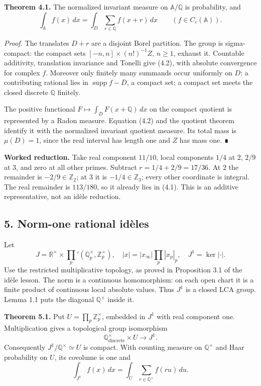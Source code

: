 \documentclass[
  english,
  11pt,
  a4paper,
]{article}
\begin{document}
\textbf{Theorem 4.1.} The normalized invariant measure on
\(\mathbb A/\mathbb Q\) is probability, and \[\int_{\mathbb A} f(x)\,dx
=\int_D\sum_{r\in\mathbb Q}f(x+r)\,dx
\qquad(f\in C_c(\mathbb A)).
\tag{4.2}\]

\emph{Proof.} The translates \(D+r\) are a disjoint Borel partition. The
group is sigma-compact: the compact sets \([-n,n]\times(n!)^{-1}Z\),
\(n\ge1\), exhaust it. Countable additivity, translation invariance and
Tonelli give (4.2), with absolute convergence for complex \(f\).
Moreover only finitely many summands occur uniformly on \(D\): a
contributing rational lies in \(\operatorname{supp}f-\overline D\), a
compact set; a compact set meets the closed discrete \(\mathbb Q\)
finitely.

The positive functional \(F\mapsto\int_D F(x+\mathbb Q)\,dx\) on the
compact quotient is represented by a Radon measure. Equation (4.2) and
the quotient theorem identify it with the normalized invariant quotient
measure. Its total mass is \(\mu(D)=1\), since the real interval has
length one and \(Z\) has mass one. ∎

\textbf{Worked reduction.} Take real component \(11/10\), local
components \(1/4\) at \(2\), \(2/9\) at \(3\), and zero at all other
primes. Subtract \(r=1/4+2/9=17/36\). At \(2\) the remainder is
\(-2/9\in\mathbb Z_2\); at \(3\) it is \(-1/4\in\mathbb Z_3\); every
other coordinate is integral. The real remainder is \(113/180\), so it
already lies in (4.1). This is an additive representative, not an idèle
reduction.

\subsection{5. Norm-one rational
idèles}\label{finite-covolume-and-arithmetic-quotients--5-norm-one-rational-iduxe8les}

Let
\[J=\mathbb R^\times\times\prod_p'(\mathbb Q_p^\times,\mathbb Z_p^\times),
\quad |x|=|x_\infty|\prod_p|x_p|_p,
\quad J^1=\ker |\cdot|.\] Use the restricted multiplicative topology, as
proved in Proposition 3.1 of the idèle lesson. The norm is a continuous
homomorphism: on each open chart it is a finite product of continuous
local absolute values. Thus \(J^1\) is a closed LCA group. Lemma 1.1
puts the diagonal \(\mathbb Q^\times\) inside it.

\textbf{Theorem 5.1.} Put \(U=\prod_p\mathbb Z_p^\times\), embedded in
\(J^1\) with real component one. Multiplication gives a topological
group isomorphism
\[\mathbb Q^\times_{\mathrm{discrete}}\times U\longrightarrow J^1.
\tag{5.1}\] Consequently \(J^1/\mathbb Q^\times\simeq U\) is compact.
With counting measure on \(\mathbb Q^\times\) and Haar probability on
\(U\), its covolume is one and \[\int_{J^1}f(x)\,dx
=\int_U\sum_{r\in\mathbb Q^\times}f(ru)\,du.
\tag{5.2}\]
\end{document}
